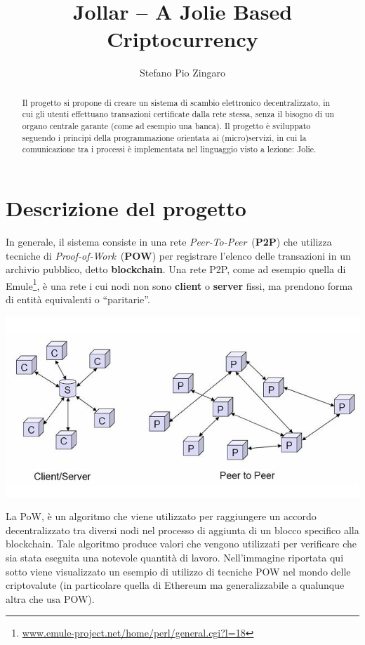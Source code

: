 \documentclass[12pt,a4paper,draft]{article}
\title{Jollar -- A Jolie Based Criptocurrency}
\author{Stefano Pio Zingaro}
\begin{document}
\maketitle

\tableofcontents

\begin{abstract}
Il progetto si propone di creare un sistema di scambio elettronico decentralizzato, in cui gli utenti effettuano transazioni certificate dalla rete stessa, senza il bisogno di un organo centrale garante (come ad esempio una banca). Il progetto è sviluppato seguendo i principi della programmazione orientata ai (micro)servizi, in cui la comunicazione tra i processi è implementata nel linguaggio visto a lezione: Jolie.
\end{abstract}

\section{Descrizione del progetto}
%
In generale, il sistema consiste in una rete \textit{Peer-To-Peer}~(\textbf{P2P}) che utilizza tecniche di \textit{Proof-of-Work}~(\textbf{POW}) per registrare l'elenco delle transazioni in un archivio pubblico, detto \textbf{blockchain}. 
Una rete P2P, come ad esempio quella di Emule\footnote{\url{www.emule-project.net/home/perl/general.cgi?l=18}}, è una rete i cui nodi non sono \textbf{client} o \textbf{server} fissi, ma prendono forma di entità equivalenti o ``paritarie''.
%
\begin{center}
    \includegraphics[width=.7\linewidth]{img/p2p}
\end{center}
%
La PoW, è un algoritmo che viene utilizzato per raggiungere un accordo decentralizzato tra diversi nodi nel processo di aggiunta di un blocco specifico alla blockchain.
Tale algoritmo produce valori che vengono utilizzati per verificare che sia stata eseguita una notevole quantità di lavoro. Nell'immagine riportata qui sotto viene visualizzato un esempio di utilizzo di tecniche POW nel mondo delle criptovalute (in particolare quella di Ethereum ma generalizzabile a qualunque altra che usa POW).
\end{document}
